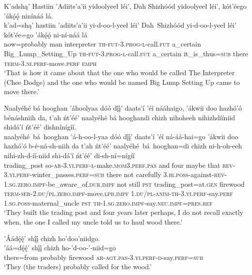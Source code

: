 \ea\label{ex:text1-9-9}
K’adshą’ Hastiin ’Adiits’a’ii yidoolyeeł léi’, Dah Shizhóód yidoolyeeł léi’, kót’éego ’ákǫ́ǫ́ ninínáá lá.\\
\gll k’ad=shą’	hastiin	’adiits’a’ii	yi-d-oo-l-yeeł	léi’	Dah~{Shizhóód}	yi-d-oo-l-yeeł	léi’	kót’ée=go	’ákǫ́ǫ́	ni-ní-náá	lá\\
     now=probably	man	interpreter	\textsc{th}-\textsc{fut}-3.\textsc{prog}-\textsc{l}-call.\textsc{fut}	a\_certain	{Big\_Lump\_Setting\_Up}	\textsc{th}-\textsc{fut}-3.\textsc{prog}-\textsc{l}-call.\textsc{fut}	a\_certain	it\_is\_thus=\textsc{sub}	there	\textsc{term}-3.\textsc{ni}.\textsc{perf}-move.\textsc{perf}	\textsc{emph}\\
\glt `That is how it came about that the one who would be called The Interpreter (Chee Dodge) and the one who would be named Big Lump Setting Up came to move there.'
\z

\ea\label{ex:text1-10-1}
Naalyéhé bá hooghan ’áhoolyaa dóó dį́į́’ daats’í ’éí nááhaigo, ’ákwii doo hazhó’ó bénáshniih da, t’ah ńt’éé’ naalyéhé bá hooghandi chizh nihoheeh nihizhdííniid shidá’í ńt’éé’ dishnínígíí.\\
\gll naalyéhé~bá~{hooghan}	’á-h-oo-l-yaa	dóó	dį́į́’	daats’í	’éí	ná-áá-hai=go	’ákwii	doo	hazhó’ó	b-é-ná-sh-niih	da	t’ah	ńt’éé’	naalyéhé~bá~{hooghan=di}	chizh	ni-h-oh-eeh	nihi-zh-d-íí-niid	shi-dá’í	ńt’éé’	di-sh-ní=nígíí\\
     trading\_post	so-\textsc{ar}-3.\textsc{yi}.\textsc{perf}-\textsc{l}-make.\textsc{mom}3.\textsc{perf}.\textsc{pas}	and	four	maybe	that	\textsc{rev}-3.\textsc{yi}.\textsc{perf}-winter\_passes.\textsc{perf}=\textsc{sub}	there	not	carefully	3.\textsc{bi}.\textsc{poss}-against-\textsc{rev}-1.\textsc{sg}.\textsc{zero}.\textsc{impf}-be\_aware\_of.\textsc{dur}.\textsc{impf}	not	still	\textsc{pst}	trading\_post=at.\textsc{gen}	firewood	\textsc{term}-\textsc{ser}-2.\textsc{du}/\textsc{pl}.\textsc{zero}.\textsc{impf}-move.\textsc{lpb}.\textsc{impf}	1.\textsc{du}/\textsc{pl}-\textsc{anim}-\textsc{th}-3.\textsc{yi}.\textsc{perf}-say.\textsc{perf}	1.\textsc{sg}.\textsc{poss}-maternal\_uncle	\textsc{pst}	\textsc{th}-1.\textsc{sg}.\textsc{zero}.\textsc{impf}-say.\textsc{neu}.\textsc{impf}=\textsc{pres}.\textsc{ref}\\
\glt `They built the trading post and four years later perhaps, I do not recall exactly when, the one I called my uncle told us to haul wood there.'
\z

\ea\label{ex:text1-10-2}
’Áádę́ę́’ shį́į́ chizh ho’doo’niidgo.\\
\gll ’áá=dę́ę́’	shį́į́	chizh	ho-’d-oo-’-niid=go\\
     there=from	probably	firewood	\textsc{ar}-\textsc{agt}.\textsc{pas}-3.\textsc{yi}.\textsc{perf}-\textsc{d}-say.\textsc{perf}=\textsc{sub}\\
\glt `They (the traders) probably called for the wood.'
\z


